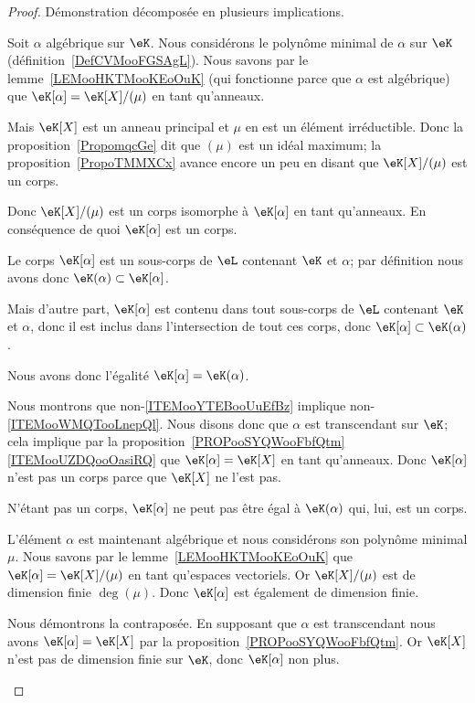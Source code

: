\begin{proof}
	Démonstration décomposée en plusieurs implications.
	\begin{subproof}

		Soit \( \alpha\) algébrique sur \( \eK\). Nous considérons le polynôme minimal de \( \alpha\) sur \( \eK\) (définition~\ref{DefCVMooFGSAgL}). Nous savons par le lemme~\ref{LEMooHKTMooKEoOuK} (qui fonctionne parce que \( \alpha\) est algébrique) que \( \eK[\alpha]=\eK[X]/(\mu)\) en tant qu'anneaux.

		Mais \( \eK[X]\) est un anneau principal et \( \mu\) en est un élément irréductible. Donc la proposition~\ref{PropomqcGe} dit que \( (\mu)\) est un idéal maximum; la proposition~\ref{PropoTMMXCx} avance encore un peu en disant que \( \eK[X]/(\mu)\) est un corps.

		Donc \( \eK[X]/(\mu)\) est un corps isomorphe à \( \eK[\alpha]\) en tant qu'anneaux. En conséquence de quoi \( \eK[\alpha]\) est un corps.

		Le corps \( \eK[\alpha]\) est un sous-corps de \( \eL\) contenant \( \eK\) et \( \alpha\); par définition nous avons donc \( \eK(\alpha)\subset \eK[\alpha]\).

		Mais d'autre part, \( \eK[\alpha]\) est contenu dans tout sous-corps de \( \eL\) contenant \( \eK\) et \( \alpha\), donc il est inclus dans l'intersection de tout ces corps, donc \( \eK[\alpha]\subset \eK(\alpha)\).

		Nous avons donc l'égalité \( \eK[\alpha]=\eK(\alpha)\).


		Nous montrons que non-\ref{ITEMooYTEBooUuEfBz} implique non-\ref{ITEMooWMQTooLnepQl}. Nous disons donc que \( \alpha\) est transcendant sur \( \eK\); cela implique par la proposition~\ref{PROPooSYQWooFbfQtm}\ref{ITEMooUZDQooOasiRQ} que \( \eK[\alpha]=\eK[X]\) en tant qu'anneaux. Donc \( \eK[\alpha]\) n'est pas un corps parce que \( \eK[X]\) ne l'est pas.

		N'étant pas un corps, \( \eK[\alpha]\) ne peut pas être égal à \( \eK(\alpha)\) qui, lui, est un corps.


		L'élément \( \alpha\) est maintenant algébrique et nous considérons son polynôme minimal \( \mu\). Nous savons par le lemme~\ref{LEMooHKTMooKEoOuK} que \( \eK[\alpha]=\eK[X]/(\mu)\) en tant qu'espaces vectoriels. Or \( \eK[X]/(\mu)\) est de dimension finie \( \deg(\mu)\). Donc \( \eK[\alpha]\) est également de dimension finie.


		Nous démontrons la contraposée. En supposant que \( \alpha\) est transcendant nous avons \( \eK[\alpha]=\eK[X]\) par la proposition~\ref{PROPooSYQWooFbfQtm}. Or \( \eK[X]\) n'est pas de dimension finie sur \( \eK\), donc \( \eK[\alpha]\) non plus.

	\end{subproof}
\end{proof}

